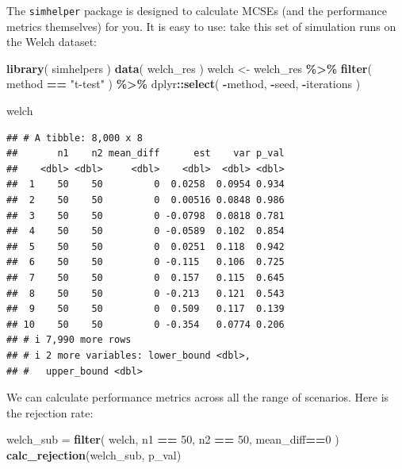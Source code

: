\documentclass[
]{book}
\newenvironment{Shaded}{\begin{snugshade}}{\end{snugshade}}
\newcommand{\DecValTok}[1]{\textcolor[rgb]{0.00,0.00,0.81}{#1}}
\newcommand{\FunctionTok}[1]{\textcolor[rgb]{0.13,0.29,0.53}{\textbf{#1}}}
\newcommand{\NormalTok}[1]{#1}
\newcommand{\OtherTok}[1]{\textcolor[rgb]{0.56,0.35,0.01}{#1}}
\newcommand{\SpecialCharTok}[1]{\textcolor[rgb]{0.81,0.36,0.00}{\textbf{#1}}}
\newcommand{\StringTok}[1]{\textcolor[rgb]{0.31,0.60,0.02}{#1}}
\begin{document}
The \texttt{simhelper} package is designed to calculate MCSEs (and the performance metrics themselves) for you.
It is easy to use: take this set of simulation runs on the Welch dataset:

\begin{Shaded}
\begin{Highlighting}[]
\FunctionTok{library}\NormalTok{( simhelpers )}
\FunctionTok{data}\NormalTok{( welch\_res )}
\NormalTok{welch }\OtherTok{\textless{}{-}}\NormalTok{ welch\_res }\SpecialCharTok{\%\textgreater{}\%}
  \FunctionTok{filter}\NormalTok{( method }\SpecialCharTok{==} \StringTok{"t{-}test"}\NormalTok{ ) }\SpecialCharTok{\%\textgreater{}\%}
\NormalTok{  dplyr}\SpecialCharTok{::}\FunctionTok{select}\NormalTok{( }\SpecialCharTok{{-}}\NormalTok{method, }\SpecialCharTok{{-}}\NormalTok{seed, }\SpecialCharTok{{-}}\NormalTok{iterations )}

\NormalTok{welch}
\end{Highlighting}
\end{Shaded}

\begin{verbatim}
## # A tibble: 8,000 x 8
##       n1    n2 mean_diff      est    var p_val
##    <dbl> <dbl>     <dbl>    <dbl>  <dbl> <dbl>
##  1    50    50         0  0.0258  0.0954 0.934
##  2    50    50         0  0.00516 0.0848 0.986
##  3    50    50         0 -0.0798  0.0818 0.781
##  4    50    50         0 -0.0589  0.102  0.854
##  5    50    50         0  0.0251  0.118  0.942
##  6    50    50         0 -0.115   0.106  0.725
##  7    50    50         0  0.157   0.115  0.645
##  8    50    50         0 -0.213   0.121  0.543
##  9    50    50         0  0.509   0.117  0.139
## 10    50    50         0 -0.354   0.0774 0.206
## # i 7,990 more rows
## # i 2 more variables: lower_bound <dbl>,
## #   upper_bound <dbl>
\end{verbatim}

We can calculate performance metrics across all the range of scenarios.
Here is the rejection rate:

\begin{Shaded}
\begin{Highlighting}[]
\NormalTok{welch\_sub }\OtherTok{=} \FunctionTok{filter}\NormalTok{( welch, n1 }\SpecialCharTok{==} \DecValTok{50}\NormalTok{, n2 }\SpecialCharTok{==} \DecValTok{50}\NormalTok{, mean\_diff}\SpecialCharTok{==}\DecValTok{0}\NormalTok{ )}
\FunctionTok{calc\_rejection}\NormalTok{(welch\_sub, p\_val)}
\end{Highlighting}
\end{Shaded}
\end{document}

